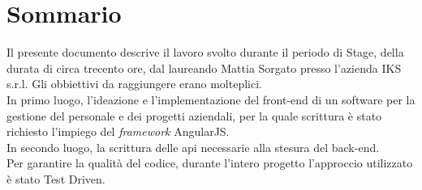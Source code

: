 
\cleardoublepage
{}
{}
\begingroup
\let\clearpage\relax
\let\cleardoublepage\relax
\let\cleardoublepage\relax

\chapter*{Sommario}

Il presente documento descrive il lavoro svolto durante il periodo di Stage, della durata di circa trecento ore, dal laureando Mattia Sorgato presso l'azienda IKS s.r.l. Gli obbiettivi da raggiungere erano molteplici.\\
In primo luogo, l'ideazione e l'implementazione del \gls{front-end} di un software per la gestione del personale e dei progetti aziendali, per la quale scrittura è stato richiesto l'impiego del \emph{framework} AngularJS.\\
In secondo luogo, la scrittura delle \gls{api} necessarie alla stesura del \gls{back-end}.\\
Per garantire la qualità del codice, durante l'intero progetto l'approccio utilizzato è stato Test Driven.

%
%

\endgroup			

\vfill

